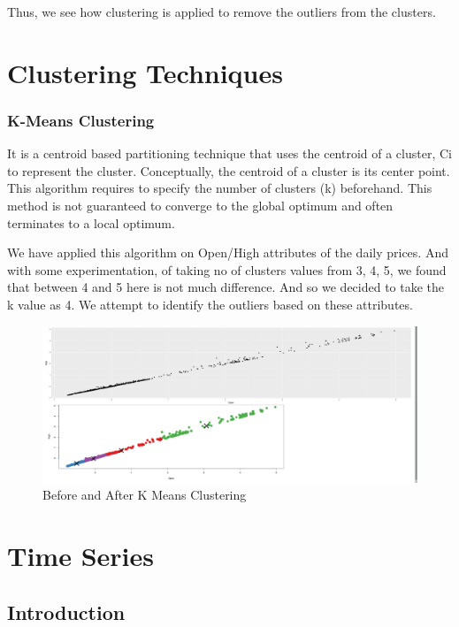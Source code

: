 \documentclass{article}
\begin{document}
Thus, we see how clustering is applied to remove the outliers from the clusters.

\section{Clustering Techniques}
\subsubsection{K-Means Clustering}

It is a centroid based partitioning technique that uses the centroid of a cluster, Ci to represent the cluster. Conceptually, the centroid of a cluster is its center point. This algorithm requires to specify the number of clusters (k) beforehand. This method is not guaranteed to converge to the global optimum and often terminates to a local optimum.

We have applied this algorithm on Open/High attributes of the daily prices. And with some experimentation, of taking no of clusters values from 3, 4, 5, we found that between 4 and 5 here is not much difference. And so we decided to take the k value as 4. We attempt to identify the outliers based on these attributes.

\begin{figure}[ht]
	\centering
	\includegraphics[scale=0.25]{images/KMeansClustering}
	\caption{Before and After K Means Clustering}
	\label{fig:kmeansclustering}
\end{figure}

\section{Time Series}

\subsection{Introduction}
\end{document}
